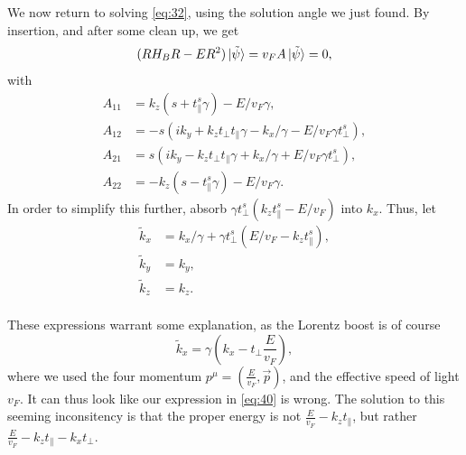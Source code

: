 We now return to solving \cref{eq:32}, using the solution angle we just found.
By insertion, and after some clean up, we get
\begin{equation}
  \label{eq:39}
  (R H_{B} R - E R^2 ) \ket{\tilde{\psi}}
  = v_F  A \ket{\tilde{\psi}} = 0,
\end{equation}
with
\begin{align*}
  A_{11} &=   k_z ( s + t_{\parallel}^s \gamma ) - E / v_F \gamma,\\
  A_{12} &=  -s ( ik_y + k_z t_\perp t_\parallel \gamma - k_x / \gamma - E /v_{F} \gamma t_{\perp}^s),\\
  A_{21} &= s ( i k_y - k_z t_\perp t_\parallel \gamma + k_x / \gamma + E /v_F \gamma t_{\perp}^s),\\
  A_{22} &= - k_z (s - t_{\parallel}^s \gamma) - E /v_F \gamma.
\end{align*}
In order to simplify this further, absorb \(\gamma t_{\perp}^s (k_{z} t_{\parallel}^s - E /v_{F}) \) into \(k_{x}\).
Thus, let
\begin{equation}
  \label{eq:40}
  \begin{split}
    \tilde{k}_{x} &= k_{x} / \gamma + \gamma t_{\perp}^s ( E /v_F - k_{z} t_{\parallel}^s),\\
    \tilde{k}_{y} &=  k_{y},\\
    \tilde{k}_{z} &=  k_{z}.\\
  \end{split}
\end{equation}

These expressions warrant some explanation, as the Lorentz boost is of course
\begin{equation}
  \label{eq:41}
  \tilde{k}_x = \gamma (k_x - t_{\perp} \frac{E}{v_{F}}),
\end{equation}
where we used the four momentum \( p^{\mu } = (\frac{E}{v_{F}}, \vec{p}) \), and the effective speed of light \( v_F \).
It can thus look like our expression in \cref{eq:40} is wrong.
The solution to this seeming inconsitency is that the proper energy is not \( \frac{E}{v_{F}} - k_z t_{\parallel} \), but rather \( \frac{E}{v_{F}} - k_z t_{\parallel} - k_x t_{\perp}\).

